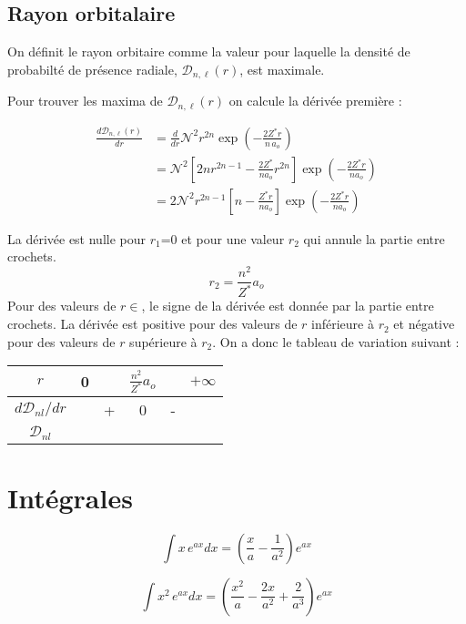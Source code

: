 \documentclass[%
aip,%
jcp,%
amsmath,amssymb,%
reprint,%
]{revtex4-1}
\newcommand*{\Ncal}{\mathcal{N}}
\begin{document}
\subsection{Rayon orbitalaire}

On définit le rayon orbitaire comme la valeur pour laquelle la densité de probabilté de
présence radiale, $\mathcal{D}_{n,\ell}(r)$, est maximale. 

Pour trouver les maxima de $\mathcal{D}_{n,\ell}(r)$ on calcule la dérivée première :

\begin{align*}
    \frac{d\mathcal{D}_{n,\ell}(r)}{dr} & = \frac{d}{dr} \Ncal^2 r^{2n} 
        \exp\left( -\frac{2Z^*r}{n\,a_o} \right) \\
    & = \Ncal^2 \left[ 2n r^{2n-1} - \frac{2Z^*}{na_o}r^{2n} \right] 
    \exp \left( -\frac{2Z^*r}{na_o} \right) \\
    & = 2\Ncal^2 r^{2n-1}\left[ n - \frac{Z^*r}{na_o} \right] 
    \exp \left( -\frac{2Z^*r}{na_o} \right)
\end{align*}

La dérivée est nulle pour $r_1$=0 et pour une valeur $r_2$ qui annule la partie entre
crochets.
%
\begin{equation*}
    r_2 = \frac{n^2}{Z^*} a_o
\end{equation*}
%
Pour des valeurs de $r\in$, le signe de la dérivée est donnée par la partie entre
crochets. La dérivée est positive pour des valeurs de $r$ inférieure à $r_2$ et négative
pour des valeurs de $r$ supérieure à $r_2$. On a donc le tableau de variation suivant :

\renewcommand{\arraystretch}{1.5}
\begin{tabular}{c|lcccl}
    $r$ & 0 & & $\frac{n^2}{Z^*} a_o$ & & $+\infty$ \\
    \hline
    $d\mathcal{D}_{nl}/dr$ & & + & 0 & - & \\
    \hline
    $\mathcal{D}_{nl}$ &
\end{tabular}

\section{Intégrales}

\begin{equation*}
    \int x\,e^{ax} dx = \left( \frac{x}{a} - \frac{1}{a^2} \right) e^{ax}
\end{equation*}

\begin{equation*}
    \int x^2\,e^{ax} dx = \left( \frac{x^2}{a} - \frac{2x}{a^2} + \frac{2}{a^3} \right) e^{ax}
\end{equation*}
\end{document}

